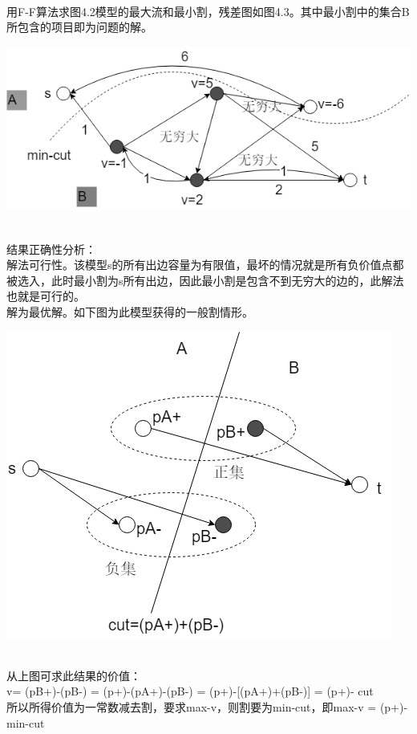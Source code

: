 \\用F-F算法求图4.2模型的最大流和最小割，残差图如图4.3。其中最小割中的集合B所包含的项目即为问题的解。\\
\centerline{\includegraphics[scale=0.6]{image/networkflow10.png}}
\\结果正确性分析：
\\解法可行性。该模型s的所有出边容量为有限值，最坏的情况就是所有负价值点都被选入，此时最小割为s所有出边，因此最小割是包含不到无穷大的边的，此解法也就是可行的。\\
解为最优解。如下图为此模型获得的一般割情形。\\
\centerline{\includegraphics[scale=0.6]{image/networkflow11.png}}
\\从上图可求此结果的价值：\\
v= (pB+)-(pB-) = (p+)-(pA+)-(pB-) = (p+)-[(pA+)+(pB-)] = (p+)- cut\\
所以所得价值为一常数减去割，要求max-v，则割要为min-cut，即max-v = (p+)-min-cut

